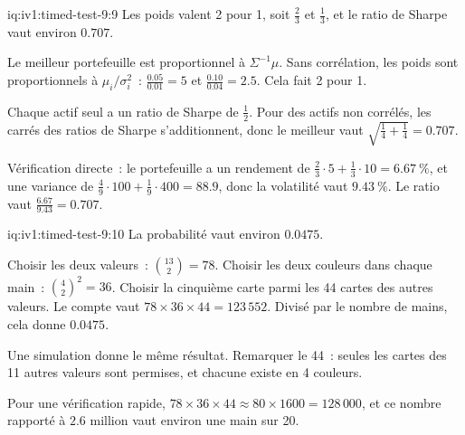 \begin{solution}{iq:iv1:timed-test-9:9}
Les poids valent 2 pour 1, soit $\frac23$ et $\frac13$, et le ratio de Sharpe vaut environ $0.707$.

Le meilleur portefeuille est proportionnel à $\Sigma^{-1}\mu$. Sans corrélation, les poids sont proportionnels à $\mu_i/\sigma_i^2$~: $\frac{0.05}{0.01} = 5$ et $\frac{0.10}{0.04} = 2.5$. Cela fait 2 pour 1.

Chaque actif seul a un ratio de Sharpe de $\frac12$. Pour des actifs non corrélés, les carrés des ratios de Sharpe s'additionnent, donc le meilleur vaut $\sqrt{\frac14 + \frac14} = 0.707$.

Vérification directe~: le portefeuille a un rendement de $\frac23 \cdot 5 + \frac13 \cdot 10 = 6.67~\%$, et une variance de $\frac49 \cdot 100 + \frac19 \cdot 400 = 88.9$, donc la volatilité vaut $9.43~\%$. Le ratio vaut $\frac{6.67}{9.43} = 0.707$.

\end{solution}

\begin{solution}{iq:iv1:timed-test-9:10}
La probabilité vaut environ $0.0475$.

Choisir les deux valeurs~: $\binom{13}{2} = 78$. Choisir les deux couleurs dans chaque main~: $\binom42^2 = 36$. Choisir la cinquième carte parmi les 44 cartes des autres valeurs. Le compte vaut $78 \times 36 \times 44 = 123\,552$. Divisé par le nombre de mains, cela donne $0.0475$.

Une simulation donne le même résultat. Remarquer le 44~: seules les cartes des 11 autres valeurs sont permises, et chacune existe en 4 couleurs.

Pour une vérification rapide, $78 \times 36 \times 44 \approx 80 \times 1600 = 128\,000$, et ce nombre rapporté à $2.6$ million vaut environ une main sur 20.

\end{solution}

